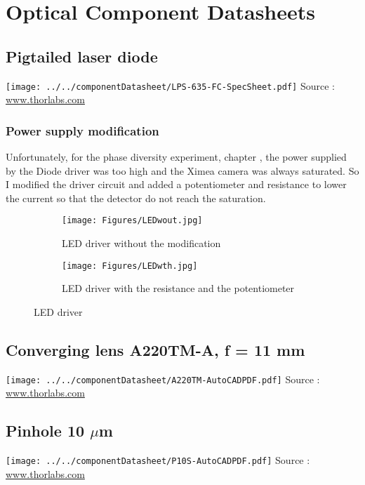 
\chapter{Optical Component Datasheets}
\label{App:OptCompDatasheet} 

\section{Pigtailed laser diode}
\label{app:pigtailedLaserDiode}
\texttt{[image: ../../componentDatasheet/LPS-635-FC-SpecSheet.pdf]}
Source : \url{www.thorlabs.com}

\subsection{Power supply modification}

Unfortunately, for the phase diversity experiment, chapter \label{ch:PDExp}, the power supplied by the Diode driver was too high and the Ximea camera was always saturated. So I modified the driver circuit and added a potentiometer and resistance to lower the current so that the detector do not reach the saturation.
\begin{figure}
\centering
    \begin{subfigure}{0.5\textwidth}
    	\centering
        \texttt{[image: Figures/LEDwout.jpg]}
        \caption{LED driver without the modification}
        \label{subfig:}
    \end{subfigure}
    \quad
    \begin{subfigure}{0.5\textwidth}
    	\centering
        \texttt{[image: Figures/LEDwth.jpg]}
        \caption{LED driver with the resistance and the potentiometer}
        \label{subfig:}
    \end{subfigure}
    \decoRule
    \caption{LED driver}
\end{figure}

\section{Converging lens A220TM-A, f = 11 mm}
\label{app:CL11}
\texttt{[image: ../../componentDatasheet/A220TM-AutoCADPDF.pdf]}
Source : \url{www.thorlabs.com}

\section{Pinhole 10 $\mu$m}
\label{app:pinhole10microns}
\texttt{[image: ../../componentDatasheet/P10S-AutoCADPDF.pdf]}
Source : \url{www.thorlabs.com}

